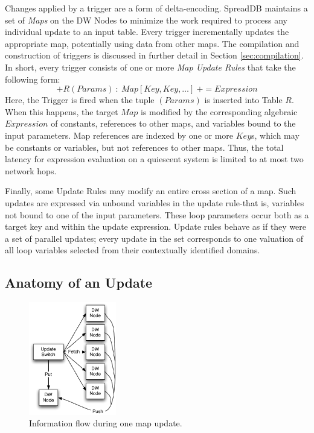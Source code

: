 \documentclass{sig-alternate}
\begin{document}
Changes applied by a trigger are a form of delta-encoding.  SpreadDB maintains a set of \textit{Maps} on the DW Nodes to minimize the work required to process any individual update to an input table.  Every trigger incrementally updates the appropriate map, potentially using data from other maps.  The compilation and construction of triggers is discussed in further detail in Section \ref{sec:compilation}.  In short, every trigger consists of one or more \textit{Map Update Rules} that take the following form:
$$+R(Params)\ :\ Map[Key, Key, \ldots]\ += Expression$$
Here, the Trigger is fired when the tuple $(Params)$ is inserted into Table $R$.  When this happens, the target $Map$ is modified by the corresponding algebraic $Expression$ of constants, references to other maps, and variables bound to the input parameters.  Map references are indexed by one or more $Key$s, which may be constants or variables, but not references to other maps.  Thus, the total latency for expression evaluation on a quiescent system is limited to at most two network hops.  

Finally, some Update Rules may modify an entire cross section of a map.  Such updates are expressed via unbound variables in the update rule-that is, variables not bound to one of the input parameters.  These loop parameters occur both as a target key and within the update expression.  Update rules behave as if they were a set of parallel updates; every update in the set corresponds to one valuation of all loop variables selected from their contextually identified domains.  

\subsection{Anatomy of an Update}

\begin{figure}
\begin{center}
\includegraphics[width=1.5in]{images/UpdateStep.pdf}
\caption{Information flow during one map update.}
\label{fig:updatestep}
\end{center}
\end{figure}
\end{document}
